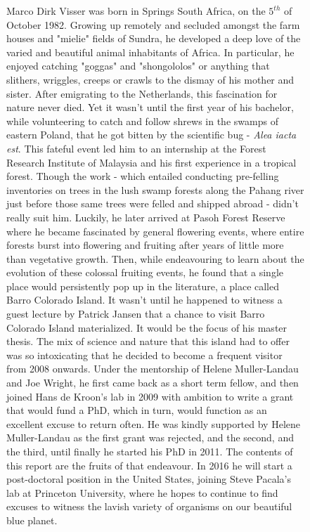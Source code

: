 \documentclass[b5paper,justified]{tufte-book} %
\begin{document}
\begin{fullwidth}
\vspace*{20cm} \begin{figure}
\vspace*{-.5cm}\hspace*{1.cm}
\hspace*{.3cm}\begin{minipage}{14.2cm} \footnotesize Marco Dirk Visser was born in Springs South Africa, on the $5^{th}$ of October 1982. Growing up remotely and secluded amongst the farm houses and "mielie" fields of Sundra, he developed a deep love of the varied and beautiful animal inhabitants of Africa. In particular, he enjoyed catching "goggas" and "shongololos" or anything that slithers, wriggles, creeps or crawls to the dismay of his mother and sister. After emigrating to the Netherlands, this fascination for nature never died. Yet it wasn't until the first year of his bachelor, while volunteering to catch and follow shrews in the swamps of eastern Poland, that he got bitten by the scientific bug - \textit{Alea iacta est}. This fateful event led him to an internship at the Forest Research Institute of Malaysia and his first experience in a tropical forest. Though the work - which entailed conducting pre-felling inventories on trees in the lush swamp forests along the Pahang river just before those same trees were felled and shipped abroad - didn't really suit him. Luckily, he later arrived at Pasoh Forest Reserve where he became fascinated by general flowering events, where entire forests burst into flowering and fruiting after years of little more than vegetative growth. Then, while endeavouring to learn about the evolution of these colossal fruiting events,   he found that a single place would persistently pop up in the literature, a place called Barro Colorado Island. It wasn't until he happened to witness a guest lecture by Patrick Jansen that a chance to visit Barro Colorado Island materialized. It would be the focus of his master thesis. The mix of science and nature that this island had to offer was so intoxicating that he decided to become a frequent visitor from 2008 onwards. Under the mentorship of Helene Muller-Landau and Joe Wright, he first came back as a short term fellow, and then joined Hans de Kroon's lab in 2009 with ambition to write a grant that would fund a PhD, which in turn, would function as an excellent excuse to return often. He was kindly supported by Helene Muller-Landau as the first grant was rejected, and the second, and the third, until finally he started his PhD in 2011. The contents of this report are the fruits of that endeavour. In 2016 he will start a post-doctoral position in the United States, joining Steve Pacala's lab at Princeton University, where he hopes to continue to find excuses to witness the lavish variety of organisms on our beautiful blue planet.
\end{minipage}
\end{figure}


\end{fullwidth}
\end{document}
